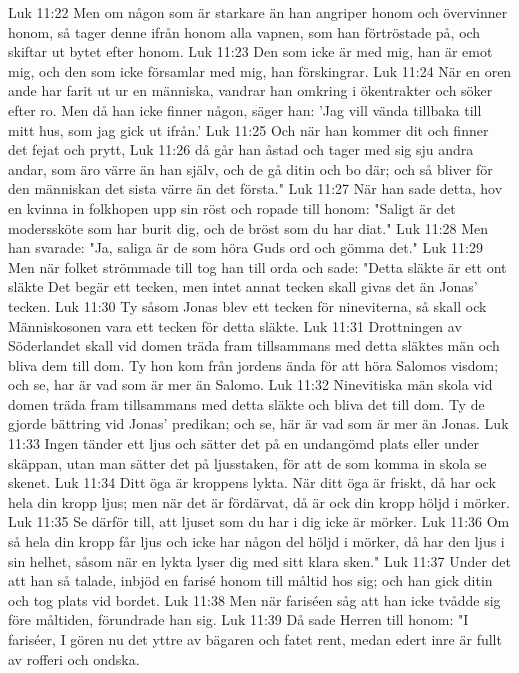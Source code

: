 Luk 11:22  Men om någon som är starkare än han angriper honom och övervinner honom, så tager denne ifrån honom alla vapnen, som han förtröstade på, och skiftar ut bytet efter honom.
Luk 11:23  Den som icke är med mig, han är emot mig, och den som icke församlar med mig, han förskingrar.
Luk 11:24  När en oren ande har farit ut ur en människa, vandrar han omkring i ökentrakter och söker efter ro. Men då han icke finner någon, säger han: 'Jag vill vända tillbaka till mitt hus, som jag gick ut ifrån.'
Luk 11:25  Och när han kommer dit och finner det fejat och prytt,
Luk 11:26  då går han åstad och tager med sig sju andra andar, som äro värre än han själv, och de gå ditin och bo där; och så bliver för den människan det sista värre än det första."
Luk 11:27  När han sade detta, hov en kvinna in folkhopen upp sin röst och ropade till honom: "Saligt är det moderssköte som har burit dig, och de bröst som du har diat."
Luk 11:28  Men han svarade: "Ja, saliga är de som höra Guds ord och gömma det."
Luk 11:29  Men när folket strömmade till tog han till orda och sade: "Detta släkte är ett ont släkte Det begär ett tecken, men intet annat tecken skall givas det än Jonas' tecken.
Luk 11:30  Ty såsom Jonas blev ett tecken för nineviterna, så skall ock Människosonen vara ett tecken för detta släkte.
Luk 11:31  Drottningen av Söderlandet skall vid domen träda fram tillsammans med detta släktes män och bliva dem till dom. Ty hon kom från jordens ända för att höra Salomos visdom; och se, har är vad som är mer än Salomo.
Luk 11:32  Ninevitiska män skola vid domen träda fram tillsammans med detta släkte och bliva det till dom. Ty de gjorde bättring vid Jonas' predikan; och se, här är vad som är mer än Jonas.
Luk 11:33  Ingen tänder ett ljus och sätter det på en undangömd plats eller under skäppan, utan man sätter det på ljusstaken, för att de som komma in skola se skenet.
Luk 11:34  Ditt öga är kroppens lykta. När ditt öga är friskt, då har ock hela din kropp ljus; men när det är fördärvat, då är ock din kropp höljd i mörker.
Luk 11:35  Se därför till, att ljuset som du har i dig icke är mörker.
Luk 11:36  Om så hela din kropp får ljus och icke har någon del höljd i mörker, då har den ljus i sin helhet, såsom när en lykta lyser dig med sitt klara sken."
Luk 11:37  Under det att han så talade, inbjöd en farisé honom till måltid hos sig; och han gick ditin och tog plats vid bordet.
Luk 11:38  Men när fariséen såg att han icke tvådde sig före måltiden, förundrade han sig.
Luk 11:39  Då sade Herren till honom: "I fariséer, I gören nu det yttre av bägaren och fatet rent, medan edert inre är fullt av rofferi och ondska.
